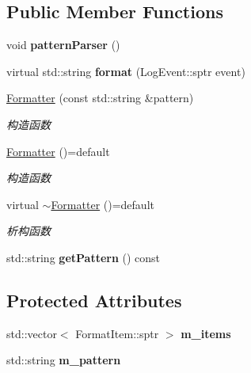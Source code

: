 \subsection*{Public Member Functions}
\begin{DoxyCompactItemize}
\item 
\mbox{\label{classFormatter_a4058bc0e6d52833be32d3f1fefd045e1}} 
void {\bfseries pattern\+Parser} ()
\item 
\mbox{\label{classFormatter_a245191c34a111f770d2f3ae003312415}} 
virtual std\+::string {\bfseries format} (Log\+Event\+::sptr event)
\item 
\hyperlink{classFormatter_a8127e81475ca541209942dfadab6cfa3}{Formatter} (const std\+::string \&pattern)
\begin{DoxyCompactList}\small\item\em 构造函数 \end{DoxyCompactList}\item 
\mbox{\label{classFormatter_a67f946643a4dc66bf9645da6ef845e6b}} 
\hyperlink{classFormatter_a67f946643a4dc66bf9645da6ef845e6b}{Formatter} ()=default
\begin{DoxyCompactList}\small\item\em 构造函数 \end{DoxyCompactList}\item 
\mbox{\label{classFormatter_a73103dd00fb85b96b58e69f0e7eab711}} 
virtual \hyperlink{classFormatter_a73103dd00fb85b96b58e69f0e7eab711}{$\sim$\+Formatter} ()=default
\begin{DoxyCompactList}\small\item\em 析构函数 \end{DoxyCompactList}\item 
\mbox{\label{classFormatter_aca36c6debb171301f2f818e06b17d380}} 
std\+::string {\bfseries get\+Pattern} () const
\end{DoxyCompactItemize}
\subsection*{Protected Attributes}
\begin{DoxyCompactItemize}
\item 
\mbox{\label{classFormatter_a33ddb4de13796f25c347152defaed000}} 
std\+::vector$<$ Format\+Item\+::sptr $>$ {\bfseries m\+\_\+items}
\item 
\mbox{\label{classFormatter_a617dc00fec4ee01820600ccf06fec0cd}} 
std\+::string {\bfseries m\+\_\+pattern}
\end{DoxyCompactItemize}


